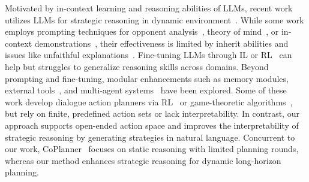 Motivated by in-context learning and reasoning abilities of LLMs, recent work utilizes LLMs for strategic reasoning in dynamic environment~\cite{zhang2024llm}.
While some work employs prompting techniques for opponent analysis~\cite{duan-etal-2024-reta}, theory of mind~\cite{gandhi2023strategic, wilf-etal-2024-think}, or in-context demonstrations~\cite{fu2023improving, wang2024voyager}, their effectiveness is limited by inherit abilities and issues like unfaithful explanations~\cite{turpin2024language}. 
Fine-tuning LLMs through IL or RL~\cite{zeng2023agenttuning,he-etal-2024-planning,putta2024agent} can help but struggles to generalize reasoning skills across domains.
Beyond prompting and fine-tuning, modular enhancements such as memory modules, external tools~\cite{zhu2023ghost,ge2023openagi,hao2023reasoning,sun2024enhancing}, and multi-agent systems~\cite{Bakhtin2022HumanlevelPI, bakhtin2023mastering,xu2023exploring,ma2024large} have been explored. Some of these work develop dialogue action planners via RL~\cite{deng2023plug,li2024dialogue} or game-theoretic algorithms~\cite{gemp2024states}, but rely on finite, predefined action sets or lack interpretability. 
In contrast, our approach supports open-ended action space and improves the interpretability of strategic reasoning by generating strategies in natural language. 
Concurrent to our work, CoPlanner~\cite{wang2024cooperative} focuses on static reasoning with limited planning rounds, whereas our method enhances strategic reasoning for dynamic long-horizon planning.

